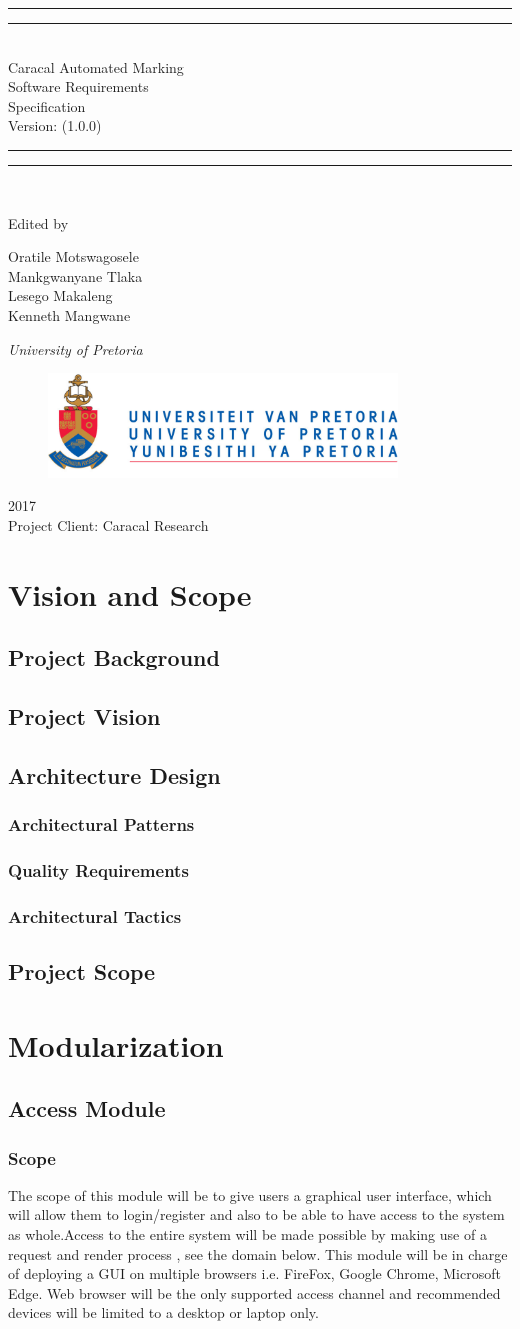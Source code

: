 \documentclass{article}
\newcommand*{\titleGP}{\begingroup %
\centering %
\vspace*{\baselineskip} %

\rule{\textwidth}{1.6pt}\vspace*{-\baselineskip}\vspace*{2pt} %
\rule{\textwidth}{0.4pt}\\[\baselineskip] %

{\LARGE Caracal Automated Marking \\ Software Requirements \\ Specification}\\[0.2\baselineskip]  %

Version: (1.0.0) 


\rule{\textwidth}{0.4pt}\vspace*{-\baselineskip}\vspace{3.2pt} %
\rule{\textwidth}{1.6pt}\\[\baselineskip] %

\scshape %
\vspace*{2\baselineskip} %

Edited by \\[\baselineskip]
{\Large Oratile Motswagosele \\ Mankgwanyane Tlaka \\ Lesego Makaleng \\ Kenneth Mangwane \par} %

{\itshape University of Pretoria\par} %

\begin{figure}[t]
\centering
	\includegraphics[width=350px]{Images/UP_Logo}
\end{figure}

{\scshape 2017} \\[0.3\baselineskip] %
{ Project Client: Caracal Research}\par %

\endgroup}
\begin{document}
\titleGP %
\pagebreak

\clearpage
\tableofcontents
\clearpage

\section{Vision and Scope}
	\subsection{Project Background}
	
	\subsection{Project Vision}
	
	\subsection{Architecture Design}
		\subsubsection{Architectural Patterns}
		\subsubsection{Quality Requirements}
		\subsubsection{Architectural Tactics}
	
	\subsection{Project Scope}
	
\section{Modularization}
	\subsection{Access Module}
		\subsubsection{Scope}
			 The scope of this module will be to give users a graphical user interface, which will allow them to login/register and also to be able to have access to the system as whole.Access to the entire system will be made possible by making use of a request and render process , see the domain below. This module will be in charge of deploying a GUI on multiple browsers i.e. FireFox, Google Chrome, Microsoft Edge. Web browser will be the only supported access channel  and recommended devices will be limited to a desktop or laptop only. 
		
\end{document}
